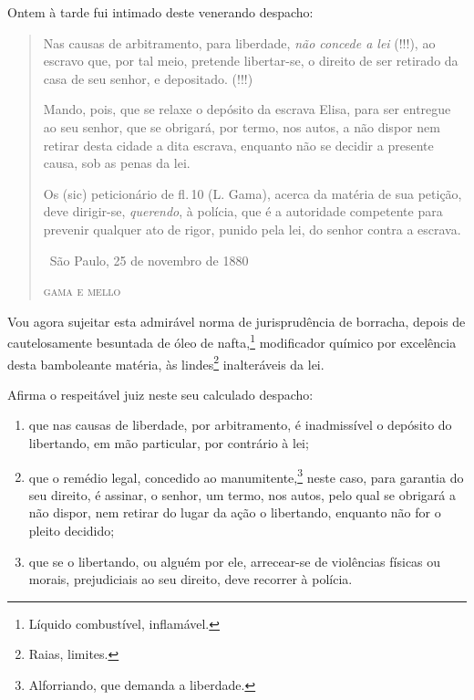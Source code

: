Ontem à tarde fui intimado deste venerando despacho:

\begin{quote}
Nas causas de arbitramento, para liberdade, \emph{não concede a lei}
(!!!), ao escravo que, por tal meio, pretende libertar-se, o direito de
ser retirado da casa de seu senhor, e depositado. (!!!)

Mando, pois, que se relaxe o depósito da escrava Elisa, para ser
entregue ao seu senhor, que se obrigará, por termo, nos autos, a não
dispor nem retirar desta cidade a dita escrava, enquanto não se decidir
a presente causa, sob as penas da lei.

Os (sic) peticionário de fl.\,10 (L. Gama), acerca da matéria de sua
petição, deve dirigir-se, \emph{querendo}, à polícia, que é a autoridade
competente para prevenir qualquer ato de rigor, punido pela lei, do
senhor contra a escrava.

\medskip

\hfill\ São Paulo, 25 de novembro de 1880

\hfill\textsc{gama e mello}
\end{quote}

\asterisc

Vou agora sujeitar esta admirável norma de jurisprudência de borracha,
depois de cautelosamente besuntada de óleo de nafta,\footnote{Líquido
  combustível, inflamável.} modificador químico por excelência desta
bamboleante matéria, às lindes\footnote{Raias, limites.} inalteráveis
da lei.

Afirma o respeitável juiz neste seu calculado despacho:

\begin{enumerate}[label=\arabic*º]
\item que nas causas de liberdade, por arbitramento, é inadmissível
o depósito do libertando, em mão particular, por contrário à lei;

\item que o remédio legal, concedido ao manumitente,\footnote{
  Alforriando, que demanda a liberdade.} neste caso, para garantia do
seu direito, é assinar, o senhor, um termo, nos autos, pelo qual se
obrigará a não dispor, nem retirar do lugar da ação o libertando,
enquanto não for o pleito decidido;

\item que se o libertando, ou alguém por ele, arrecear-se de
violências físicas ou morais, prejudiciais ao seu direito, deve recorrer
à polícia.
\end{enumerate}

